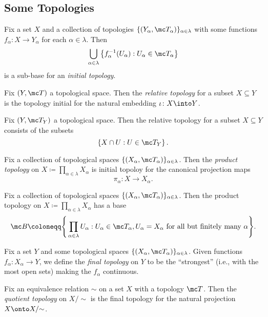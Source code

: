 \documentclass{article}
\begin{document}
\subsection{Some Topologies}
\begin{defihelper} 
	Fix a set $X$ and a collection of topologies $\{(Y_\alpha,\mc T_\alpha)\}_{\alpha\in\lambda}$ with some functions $f_\alpha\colon X\to Y_\alpha$ for each $\alpha\in\lambda$. Then
	\[\bigcup_{\alpha\in\lambda}\left\{f_\alpha^{-1}(U_\alpha):U_\alpha\in\mc T_\alpha\right\}\]
	is a sub-base for an \textit{initial topology}.
\end{defihelper}
\begin{defihelper} 
	Fix $(Y,\mc T)$ a topological space. Then the \textit{relative topology} for a subset $X\subseteq Y$ is the topology initial for the natural embedding $\iota\colon X\into Y$.
\end{defihelper}
\begin{lemma} \label{lem:betterrelative}
	Fix $(Y,\mc T_Y)$ a topological space. Then the relative topology for a subset $X\subseteq Y$ consists of the subsets
	\[\left\{X\cap U:U\in\mc T_Y\right\}.\]
\end{lemma}
\begin{defihelper} 
	Fix a collection of topological spaces $\{(X_\alpha,\mc T_\alpha)\}_{\alpha\in\lambda}$. Then the \textit{product topology} on $X\coloneqq\prod_{\alpha\in\lambda}X_\alpha$ is initial topoloy for the canonical projection maps
	\[\pi_\alpha\colon X\to X_\alpha.\]
\end{defihelper}
\begin{lemma} \label{lem:prodtopbase}
	Fix a collection of topological spaces $\{(X_\alpha,\mc T_\alpha)\}_{\alpha\in\lambda}$. Then the product topology on $X\coloneqq\prod_{\alpha\in\lambda}X_\alpha$ has a base
	\[\mc B\coloneqq\Bigg\{\prod_{\alpha\in\lambda}U_\alpha:U_\alpha\in\mc T_\alpha,U_\alpha=X_\alpha\text{ for all but finitely many }\alpha\Bigg\}.\]
\end{lemma}
\begin{defihelper} 
	Fix a set $Y$ and some topological spaces $\{(X_\alpha,\mc T_\alpha)\}_{\alpha\in\lambda}$. Given functions $f_\alpha\colon X_\alpha\to Y$, we define the \textit{final topology} on $Y$ to be the ``strongest'' (i.e., with the most open sets) making the $f_\alpha$ continuous.
\end{defihelper}
\begin{defihelper} 
	Fix an equivalence relation $\sim$ on a set $X$ with a topology $\mc T$. Then the \textit{quotient topology} on $X/{\sim}$ is the final topology for the natural projection $X\onto X/{\sim}$.
\end{defihelper}
\end{document}
